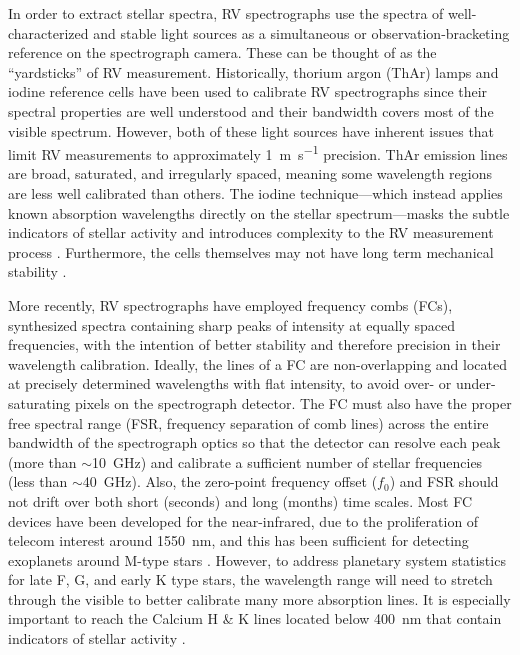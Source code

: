 In order to extract stellar spectra, RV spectrographs use the spectra of well-characterized and stable light sources as a simultaneous or observation-bracketing reference on the spectrograph camera. These can be thought of as the ``yardsticks'' of RV measurement. Historically, thorium argon (ThAr) lamps and iodine reference cells have been used to calibrate RV spectrographs since their spectral properties are well understood and their bandwidth covers most of the visible spectrum. However, both of these light sources have inherent issues that limit RV measurements to approximately \SI{1}{\meter\per\second} precision. ThAr emission lines are broad, saturated, and irregularly spaced, meaning some wavelength regions are less well calibrated than others. The iodine technique---which instead applies known absorption wavelengths directly on the stellar spectrum---masks the subtle indicators of stellar activity and introduces complexity to the RV measurement process \citep{spronck_fiber_2015}. Furthermore, the cells themselves may not have long term mechanical stability \citep{fischer_twenty-five_2014}.

More recently, RV spectrographs have employed frequency combs (FCs), synthesized spectra containing sharp peaks of intensity at equally spaced frequencies, with the intention of better stability and therefore precision in their wavelength calibration. Ideally, the lines of a FC are non-overlapping and located at precisely determined wavelengths with flat intensity, to avoid over- or under-saturating pixels on the spectrograph detector. The FC must also have the proper free spectral range (FSR, frequency separation of comb lines) across the entire bandwidth of the spectrograph optics so that the detector can resolve each peak (more than $\sim$\SI{10}{\giga\hertz}) and calibrate a sufficient number of stellar frequencies (less than $\sim$\SI{40}{\giga\hertz}). Also, the zero-point frequency offset ($f_0$) and FSR should not drift over both short (seconds) and long (months) time scales. Most FC devices have been developed for the near-infrared, due to the proliferation of telecom interest around \SI{1550}{\nano\meter}, and this has been sufficient for detecting exoplanets around M-type stars \citep{fischer_state_2016}. However, to address planetary system statistics for late F, G, and early K type stars, the wavelength range will need to stretch through the visible to better calibrate many more absorption lines. It is especially important to reach the Calcium H \& K lines located below \SI{400}{\nano\meter} that contain indicators of stellar activity \citep{isaacson_chromospheric_2010, lovis_harps_2011}.


